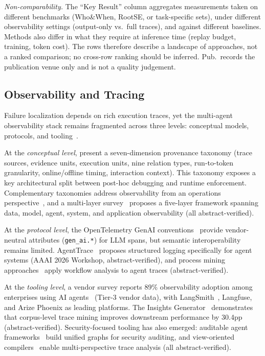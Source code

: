 \vspace{-2pt}
{\footnotesize \emph{Non-comparability.} The ``Key Result'' column aggregates measurements taken on different benchmarks (Who\&When, RootSE, or task-specific sets), under different observability settings (output-only vs.\ full traces), and against different baselines. Methods also differ in what they require at inference time (replay budget, training, token cost). The rows therefore describe a landscape of approaches, not a ranked comparison; no cross-row ranking should be inferred. Pub.\ records the publication venue only and is not a quality judgement.}

\subsection{Observability and Tracing}\label{sec:diag_obs}

Failure localization depends on rich execution traces, yet the multi-agent observability stack remains fragmented across three levels: conceptual models, protocols, and tooling~\cite{aiobsmultilayer2026}.

At the \emph{conceptual level}, \cite{agenttraces2026} present a seven-dimension provenance taxonomy (trace sources, evidence units, execution units, nine relation types, run-to-token granularity, online/offline timing, interaction context). This taxonomy exposes a key architectural split between post-hoc debugging and runtime enforcement. Complementary taxonomies address observability from an operations perspective~\cite{agentopscsiro2024, architectingops2026, agentsysops2026}, and a multi-layer survey~\cite{aiobsmultilayer2026} proposes a five-layer framework spanning data, model, agent, system, and application observability (all abstract-verified).

At the \emph{protocol level}, the OpenTelemetry GenAI conventions~\cite{opentelemetry2026} provide vendor-neutral attributes (\texttt{gen\_ai.*}) for LLM spans, but semantic interoperability remains limited. AgentTrace~\cite{agenttrace2026} proposes structured logging specifically for agent systems (AAAI 2026 Workshop, abstract-verified), and process mining approaches~\cite{processobserv2025} apply workflow analysis to agent traces (abstract-verified).

At the \emph{tooling level}, a vendor survey reports 89\% observability adoption among enterprises using AI agents~\cite{zapier2025} (Tier-3 vendor data), with LangSmith~\cite{langsmith2026}, Langfuse, and Arize Phoenix as leading platforms. The Insights Generator~\cite{insightsgenerator2026} demonstrates that corpus-level trace mining improves downstream performance by 30.4pp (abstract-verified). Security-focused tooling has also emerged: auditable agent frameworks~\cite{auditableagents2026, secaudit2026} build unified graphs for security auditing, and view-oriented compilers~\cite{viewcompiler2026} enable multi-perspective trace analysis (all abstract-verified).

